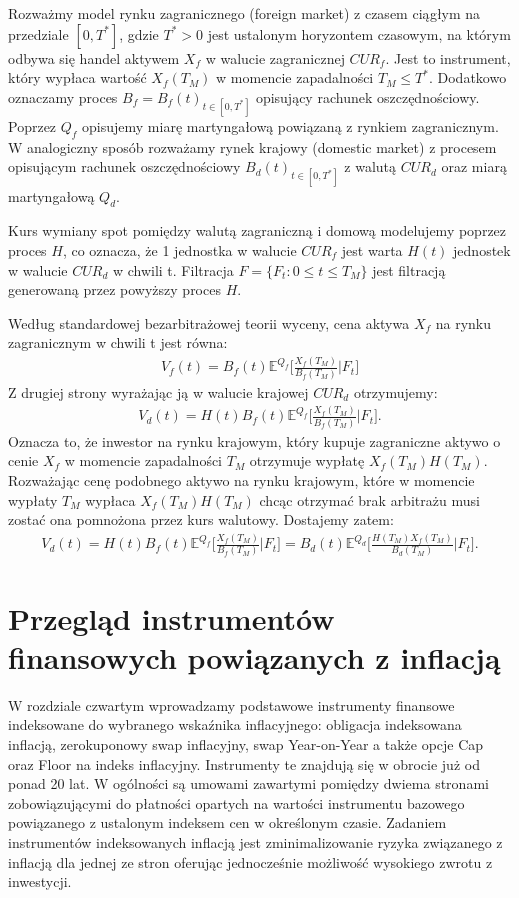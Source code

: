 \documentclass{mini}
\theoremstyle{mythstyle}
\begin{document}
Rozważmy model rynku zagranicznego (foreign market) z czasem ciągłym na przedziale $[0, T^*]$, gdzie $T^* >  0$ jest ustalonym horyzontem czasowym, na którym odbywa się handel aktywem  $X_f$ w walucie zagranicznej $CUR_f$. Jest to instrument, który wypłaca wartość $X_f(T_M)$ w momencie zapadalności $T_M \le T^* $. Dodatkowo oznaczamy proces $B_f = B_f(t)_{t \in [0,T^*]}$ opisujący rachunek oszczędnościowy. Poprzez $Q_f$ opisujemy miarę martyngałową powiązaną z rynkiem zagranicznym. W analogiczny sposób rozważamy rynek krajowy (domestic market)  z procesem opisującym rachunek oszczędnościowy $B_d(t)_{t \in [0,T^*]}$ z walutą $CUR_d$ oraz miarą martyngałową $Q_d$. 

Kurs wymiany spot pomiędzy walutą zagraniczną i domową modelujemy poprzez proces 
$H$, co oznacza, że 1 jednostka w walucie $CUR_f$ jest warta $H(t)$ jednostek w walucie $CUR_d$ w chwili t. Filtracja $F = \{F_t: 0 \le t \le T_M\}$ jest filtracją generowaną przez powyższy proces $H$.

Według standardowej bezarbitrażowej teorii wyceny, cena aktywa  $X_f$ na rynku zagranicznym w chwili t  jest równa:
\begin{eqnarray}
	V_f(t) = B_f(t) \mathbb{E}^{Q_f}\bigg[\frac{X_f(T_M)}{B_f(T_M)}\bigg|F_t\bigg]
\end{eqnarray}
Z drugiej strony wyrażając ją w walucie krajowej $CUR_d$ otrzymujemy:
\begin{eqnarray}
	V_d(t) = H(t) B_f(t) \mathbb{E}^{Q_f}\bigg[\frac{X_f(T_M)}{B_f(T_M)}\bigg|F_t\bigg].
\end{eqnarray}
Oznacza to, że inwestor na rynku krajowym, który kupuje zagraniczne aktywo o cenie $X_f$ w momencie zapadalności $T_M$ otrzymuje wypłatę $X_f(T_M) H(T_M)$. Rozważając cenę podobnego aktywo na rynku krajowym, które w momencie wypłaty $T_M$ wypłaca $X_f(T_M) H(T_M)$ chcąc otrzymać brak arbitrażu musi zostać ona pomnożona przez kurs walutowy. Dostajemy zatem:
\begin{eqnarray}
	V_d(t) = H(t) B_f(t) \mathbb{E}^{Q_f}\bigg[\frac{X_f(T_M)}{B_f(T_M)}\bigg|F_t\bigg] = B_d(t) \mathbb{E}^{Q_d} \bigg[ \frac{H(T_M)X_f(T_M)}{B_d(T_M)} \bigg| F_t\bigg].
\end{eqnarray}

\chapter{Przegląd instrumentów finansowych powiązanych z inflacją}

	W rozdziale czwartym wprowadzamy podstawowe instrumenty finansowe indeksowane do wybranego wskaźnika inflacyjnego: obligacja indeksowana inflacją, zerokuponowy swap inflacyjny, swap Year-on-Year a także opcje Cap oraz Floor na indeks inflacyjny. Instrumenty te znajdują się w obrocie już od ponad 20 lat. W ogólności są umowami zawartymi pomiędzy dwiema stronami zobowiązującymi do płatności opartych na wartości instrumentu bazowego powiązanego z ustalonym indeksem cen w określonym czasie. Zadaniem instrumentów indeksowanych inflacją jest zminimalizowanie ryzyka związanego z inflacją dla jednej ze stron oferując jednocześnie możliwość wysokiego zwrotu z inwestycji.
	
\end{document}
